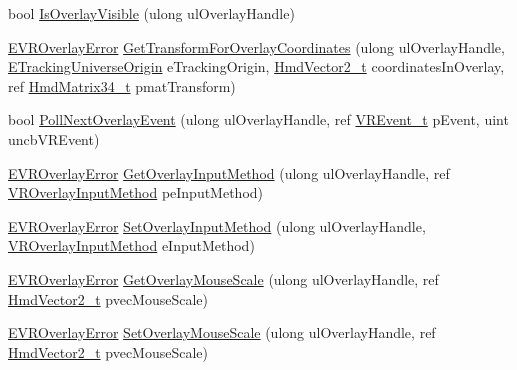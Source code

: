 \begin{DoxyCompactItemize}
\item 
bool \mbox{\hyperlink{class_valve_1_1_v_r_1_1_c_v_r_overlay_a3fff124048fa05c2312f899eb7c26b8e}{Is\+Overlay\+Visible}} (ulong ul\+Overlay\+Handle)
\item 
\mbox{\hyperlink{namespace_valve_1_1_v_r_aaee5c5144f42b7969d45b854f51b0c18}{E\+V\+R\+Overlay\+Error}} \mbox{\hyperlink{class_valve_1_1_v_r_1_1_c_v_r_overlay_a4243118984e980d39391875cb1faaf93}{Get\+Transform\+For\+Overlay\+Coordinates}} (ulong ul\+Overlay\+Handle, \mbox{\hyperlink{namespace_valve_1_1_v_r_a29be99a3c2f780157bd490db06a7f12f}{E\+Tracking\+Universe\+Origin}} e\+Tracking\+Origin, \mbox{\hyperlink{struct_valve_1_1_v_r_1_1_hmd_vector2__t}{Hmd\+Vector2\+\_\+t}} coordinates\+In\+Overlay, ref \mbox{\hyperlink{struct_valve_1_1_v_r_1_1_hmd_matrix34__t}{Hmd\+Matrix34\+\_\+t}} pmat\+Transform)
\item 
bool \mbox{\hyperlink{class_valve_1_1_v_r_1_1_c_v_r_overlay_ac2d2b7c13bc798f3aa6518a588270899}{Poll\+Next\+Overlay\+Event}} (ulong ul\+Overlay\+Handle, ref \mbox{\hyperlink{struct_valve_1_1_v_r_1_1_v_r_event__t}{V\+R\+Event\+\_\+t}} p\+Event, uint uncb\+V\+R\+Event)
\item 
\mbox{\hyperlink{namespace_valve_1_1_v_r_aaee5c5144f42b7969d45b854f51b0c18}{E\+V\+R\+Overlay\+Error}} \mbox{\hyperlink{class_valve_1_1_v_r_1_1_c_v_r_overlay_adc16b864ffaae52d5e294b1e2349b74f}{Get\+Overlay\+Input\+Method}} (ulong ul\+Overlay\+Handle, ref \mbox{\hyperlink{namespace_valve_1_1_v_r_a43f4e4c6980efb8b0d2a954640203d74}{V\+R\+Overlay\+Input\+Method}} pe\+Input\+Method)
\item 
\mbox{\hyperlink{namespace_valve_1_1_v_r_aaee5c5144f42b7969d45b854f51b0c18}{E\+V\+R\+Overlay\+Error}} \mbox{\hyperlink{class_valve_1_1_v_r_1_1_c_v_r_overlay_a721f82585ced5b9cacbfebb58152c368}{Set\+Overlay\+Input\+Method}} (ulong ul\+Overlay\+Handle, \mbox{\hyperlink{namespace_valve_1_1_v_r_a43f4e4c6980efb8b0d2a954640203d74}{V\+R\+Overlay\+Input\+Method}} e\+Input\+Method)
\item 
\mbox{\hyperlink{namespace_valve_1_1_v_r_aaee5c5144f42b7969d45b854f51b0c18}{E\+V\+R\+Overlay\+Error}} \mbox{\hyperlink{class_valve_1_1_v_r_1_1_c_v_r_overlay_a0a5564aac6f9b1382125ee7bba858e94}{Get\+Overlay\+Mouse\+Scale}} (ulong ul\+Overlay\+Handle, ref \mbox{\hyperlink{struct_valve_1_1_v_r_1_1_hmd_vector2__t}{Hmd\+Vector2\+\_\+t}} pvec\+Mouse\+Scale)
\item 
\mbox{\hyperlink{namespace_valve_1_1_v_r_aaee5c5144f42b7969d45b854f51b0c18}{E\+V\+R\+Overlay\+Error}} \mbox{\hyperlink{class_valve_1_1_v_r_1_1_c_v_r_overlay_a2ad8de82b2f52064ad5e765225869dd7}{Set\+Overlay\+Mouse\+Scale}} (ulong ul\+Overlay\+Handle, ref \mbox{\hyperlink{struct_valve_1_1_v_r_1_1_hmd_vector2__t}{Hmd\+Vector2\+\_\+t}} pvec\+Mouse\+Scale)

\end{DoxyCompactItemize}
